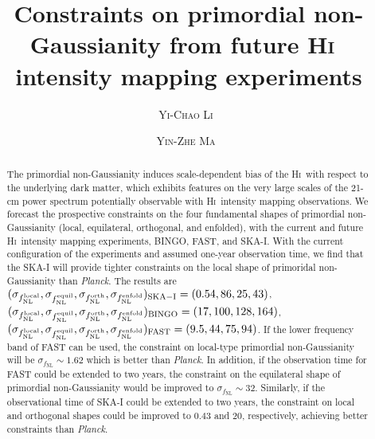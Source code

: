 \documentclass[twocolumn,floatfix,nofootinbib,aps,reprint]{revtex4}
\def\hi{\textsc{Hi~}}
\begin{document}
\title{{\textbf Constraints on primordial non-Gaussianity from future \hi 
intensity mapping experiments}}
\author{\textsc{Yi-Chao Li~}}
\author{\textsc{Yin-Zhe Ma~}}

\begin{abstract}
The primordial non-Gaussianity induces scale-dependent bias of the \hi with respect to the underlying dark matter, which exhibits features on the very large scales of the 21-cm power spectrum potentially observable with \hi intensity mapping observations. We forecast the prospective constraints on the four fundamental shapes of primordial non-Gaussianity (local, equilateral, orthogonal, and enfolded), with the current and future \hi intensity mapping experiments, BINGO, FAST, and SKA-I. With the current configuration of the experiments and assumed one-year observation time, we find that the SKA-I will provide tighter constraints on the local shape of primoridal non-Gaussianity than {\it Planck}. The results are
$(\sigma_{f^{\rm local}_{\rm NL}},\sigma_{f^{\rm equil}_{\rm NL}},\sigma_{f^{\rm orth}_{\rm NL}},\sigma_{f^{\rm enfold}_{\rm NL}})_{\rm SKA-I}=(0.54, 86, 25, 43)$, $(\sigma_{f^{\rm local}_{\rm NL}},\sigma_{f^{\rm equil}_{\rm NL}},\sigma_{f^{\rm orth}_{\rm NL}},\sigma_{f^{\rm enfold}_{\rm NL}})_{\rm BINGO}=(17, 100, 128, 164)$, $(\sigma_{f^{\rm local}_{\rm NL}},\sigma_{f^{\rm equil}_{\rm NL}},\sigma_{f^{\rm orth}_{\rm NL}},\sigma_{f^{\rm enfold}_{\rm NL}})_{\rm FAST}=(9.5, 44, 75, 94)$. If the lower frequency band of FAST can be used, the constraint on 
    local-type primordial non-Gaussianity will be $\sigma_{f_\mathrm{NL}}\sim1.62$ which is better than {\it Planck}. In addition, if the observation time for FAST could be extended to two years, 
    the constraint on the equilateral shape of primordial non-Gaussianity would
    be improved to $\sigma_{f_\mathrm{NL}}\sim32$. Similarly, if the observational time of SKA-I could be
    extended to two years, the constraint on local and orthogonal shapes could be improved to $0.43$ and $20$, respectively, achieving better constraints than {\it Planck}. 
\end{abstract}

\maketitle
\end{document}

